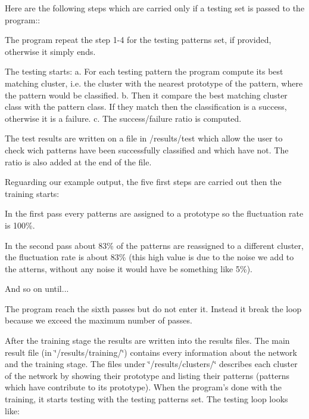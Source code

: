 Here are the following steps which are carried only if a testing set is passed to the program\-:\-:


\begin{DoxyEnumerate}
\item The program repeat the step 1-\/4 for the testing patterns set, if provided, otherwise it simply ends.
\item The testing starts\-: a. For each testing pattern the program compute its best matching cluster, i.\-e. the cluster with the nearest prototype of the pattern, where the pattern would be classified. b. Then it compare the best matching cluster class with the pattern class. If they match then the classification is a success, otherwise it is a failure. c. The success/failure ratio is computed.
\item The test results are written on a file in /results/test which allow the user to check wich patterns have been successfully classified and which have not. The ratio is also added at the end of the file.
\end{DoxyEnumerate}

Reguarding our example output, the five first steps are carried out then the training starts\-:


\begin{DoxyItemize}
\item In the first pass every patterns are assigned to a prototype so the fluctuation rate is 100\%.
\item In the second pass about 83\% of the patterns are reassigned to a different cluster, the fluctuation rate is about 83\% (this high value is due to the noise we add to the atterns, without any noise it would have be something like 5\%).
\item And so on until...
\item The program reach the sixth passes but do not enter it. Instead it break the loop because we exceed the maximum number of passes.
\end{DoxyItemize}

After the training stage the results are written into the results files. The main result file (in \char`\"{}/results/training/\char`\"{}) contains every information about the network and the training stage. The files under \char`\"{}/results/clusters/\char`\"{} describes each cluster of the network by showing their prototype and listing their patterns (patterns which have contribute to its prototype). When the program's done with the training, it starts testing with the testing patterns set. The testing loop looks like\-:


